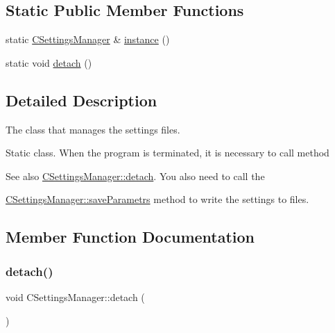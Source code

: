 \subsection*{Static Public Member Functions}
\begin{DoxyCompactItemize}
\item 
static \mbox{\hyperlink{class_c_settings_manager}{C\+Settings\+Manager}} \& \mbox{\hyperlink{class_c_settings_manager_a40c0ffaf515eb306a9f83e3d631bcd21}{instance}} ()
\item 
static void \mbox{\hyperlink{class_c_settings_manager_a64524171654c8a7076af9ac9ac780bfc}{detach}} ()
\end{DoxyCompactItemize}


\subsection{Detailed Description}
The class that manages the settings files.

Static class. When the program is terminated, it is necessary to call method \begin{DoxySeeAlso}{See also}
\mbox{\hyperlink{class_c_settings_manager_a64524171654c8a7076af9ac9ac780bfc}{C\+Settings\+Manager\+::detach}}. You also need to call the 

\mbox{\hyperlink{class_c_settings_manager_a874956b5cb03b94bbb85ae0a5b25733f}{C\+Settings\+Manager\+::save\+Parametrs}} method to write the settings to files. 
\end{DoxySeeAlso}


\subsection{Member Function Documentation}
\mbox{\label{class_c_settings_manager_a64524171654c8a7076af9ac9ac780bfc}} 
\subsubsection{\texorpdfstring{detach()}{detach()}}
{\footnotesize\ttfamily void C\+Settings\+Manager\+::detach (\begin{DoxyParamCaption}{ }\end{DoxyParamCaption})\hspace{0.3cm}{\ttfamily [static]}}

